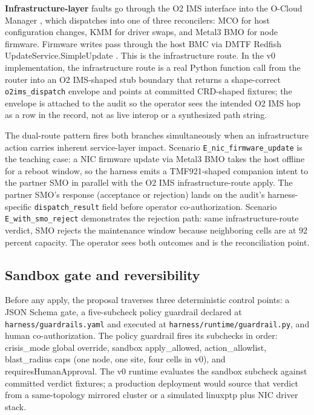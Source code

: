 \documentclass[twocolumn,10pt,a4paper]{article}
\begin{document}
\textbf{Infrastructure-layer} faults go through the O2 IMS interface \cite{oran_o2_ganp,oran_o2_ims} into the O-Cloud Manager \cite{oran_o2ims_ocm}, which dispatches into one of three reconcilers: MCO \cite{openshift_mco} for host configuration changes, KMM \cite{kmm_operator} for driver swaps, and Metal3 BMO \cite{metal3_bmo} for node firmware. Firmware writes pass through the host BMC via DMTF Redfish UpdateService.SimpleUpdate \cite{dmtf_redfish}. This is the infrastructure route. In the v0 implementation, the infrastructure route is a real Python function call from the router into an O2 IMS-shaped stub boundary that returns a shape-correct \texttt{o2ims\_dispatch} envelope and points at committed CRD-shaped fixtures; the envelope is attached to the audit so the operator sees the intended O2 IMS hop as a row in the record, not as live interop or a synthesized path string.

The dual-route pattern fires both branches simultaneously when an infrastructure action carries inherent service-layer impact. Scenario \texttt{E\_nic\_firmware\_update} is the teaching case: a NIC firmware update via Metal3 BMO takes the host offline for a reboot window, so the harness emits a TMF921-shaped companion intent to the partner SMO in parallel with the O2 IMS infrastructure-route apply. The partner SMO's response (acceptance or rejection) lands on the audit's harness-specific \texttt{dispatch\_result} field before operator co-authorization. Scenario \texttt{E\_with\_smo\_reject} demonstrates the rejection path: same infrastructure-route verdict, SMO rejects the maintenance window because neighboring cells are at 92 percent capacity. The operator sees both outcomes and is the reconciliation point.

\subsection{Sandbox gate and reversibility}

Before any apply, the proposal traverses three deterministic control points: a JSON Schema gate, a five-subcheck policy guardrail declared at \texttt{harness/guardrails.yaml} and executed at \texttt{harness/runtime/guardrail.py}, and human co-authorization. The policy guardrail fires its subchecks in order: crisis\_mode global override, sandbox apply\_allowed, action\_allowlist, blast\_radius caps (one node, one site, four cells in v0), and requiresHumanApproval. The v0 runtime evaluates the sandbox subcheck against committed verdict fixtures; a production deployment would source that verdict from a same-topology mirrored cluster or a simulated linuxptp plus NIC driver stack.
\end{document}
